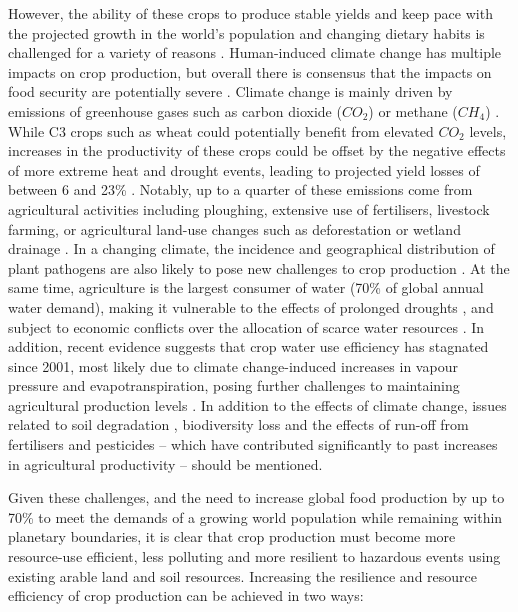 However, the ability of these crops to produce stable yields and keep pace with the projected growth in the world's population and changing dietary habits is challenged for a variety of reasons \citep{tilman_global_2011}. Human-induced climate change has multiple impacts on crop production, but overall there is consensus that the impacts on food security are potentially severe \citep{schmidhuber_global_2007,godfray_food_2010,rezaei_climate_2023}. Climate change is mainly driven by emissions of greenhouse gases such as carbon dioxide ($CO_2$) or methane ($CH_4$) \citep{ipcc_summary_2023}. While C3 crops such as wheat could potentially benefit from elevated $CO_2$ levels, increases in the productivity of these crops could be offset by the negative effects of more extreme heat and drought events, leading to projected yield losses of between 6 and 23\% \citep{rezaei_climate_2023}. Notably, up to a quarter of these emissions come from agricultural activities including ploughing, extensive use of fertilisers, livestock farming, or agricultural land-use changes such as deforestation or wetland drainage \citep{laborde_agricultural_2021}. In a changing climate, the incidence and geographical distribution of plant pathogens are also likely to pose new challenges to crop production \citep{burdon_climate_2020}. At the same time, agriculture is the largest consumer of water (70\% of global annual water demand), making it vulnerable to the effects of prolonged droughts \citep{meza_global-scale_2020}, and subject to economic conflicts over the allocation of scarce water resources \citep{rosa_global_2020}. In addition, recent evidence suggests that crop water use efficiency has stagnated since 2001, most likely due to climate change-induced increases in vapour pressure and evapotranspiration, posing further challenges to maintaining agricultural production levels \citep{li_global_2023}. In addition to the effects of climate change, issues related to soil degradation \citep{bindraban_assessing_2012}, biodiversity loss \citep{lanz_expansion_2018, abdi_biodiversity_2021} and the effects of run-off from fertilisers and pesticides -- which have contributed significantly to past increases in agricultural productivity \citep{pingali_green_2012} -- should be mentioned.

Given these challenges, and the need to increase global food production by up to 70\% to meet the demands of a growing world population \citep{hertel_global_2011} while remaining within planetary boundaries, it is clear that crop production must become more resource-use efficient, less polluting and more resilient to hazardous events using existing arable land and soil resources. Increasing the resilience and resource efficiency of crop production can be achieved in two ways:

